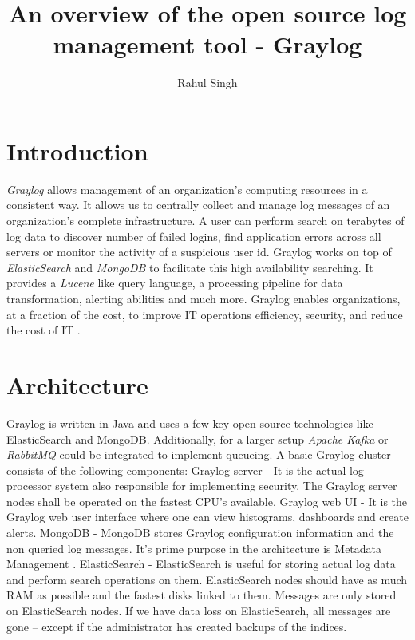\documentclass[9pt,twocolumn,twoside]{../../styles/osajnl}
\title{An overview of the open source log management tool - Graylog}
\author[1]{Rahul Singh}
\affil[1]{School of Informatics and Computing, Bloomington, IN 47408, U.S.A.}
\affil[*]{Corresponding authors: rahpsing@iu.edu}
\begin{document}
\maketitle

\section{Introduction}
\emph{Graylog} \cite{www-graylog-org} allows management of an
organization's computing resources in a consistent way. It allows us
to centrally collect and manage log messages of an organization’s
complete infrastructure. A user can perform search on terabytes of log
data to discover number of failed logins, find application errors
across all servers or monitor the activity of a suspicious user
id. Graylog works on top of \emph{ElasticSearch}
\cite{www-elasticsearch-wiki} and \emph{MongoDB}
\cite{www-mongodb-wiki} to facilitate this high availability
searching. It provides a \emph{Lucene} \cite{www-apachelucene-org}
like query language, a processing pipeline for data transformation,
alerting abilities and much more. Graylog enables organizations, at a
fraction of the cost, to improve IT operations efficiency, security,
and reduce the cost of IT \cite{www-graylog-hightech}.


\section{Architecture}

Graylog is written in Java and uses a few key open source technologies
like ElasticSearch and MongoDB. Additionally, for a larger setup
\emph{Apache Kafka} \cite{www-apachekafka-org} or \emph{RabbitMQ}
\cite{www-rabbitmq-com} could be integrated to implement queueing. A
basic Graylog cluster consists of the following components:
\newline
\newline
Graylog server - It is the actual log processor system also
responsible for implementing security. The Graylog server nodes shall
be operated on the fastest CPU's available.
\newline
\newline
Graylog web UI - It is the Graylog web user interface where one can
view histograms, dashboards and create alerts.
\newline
\newline
MongoDB - MongoDB stores Graylog configuration information and the non
queried log messages. It's prime purpose in the architecture is Metadata
Management \cite{www-graylogprocessing-severalnines}.
\newline
\newline
ElasticSearch - ElasticSearch is useful for storing actual log data
and perform search operations on them. ElasticSearch nodes should have
as much RAM as possible and the fastest disks linked to them. Messages
are only stored on ElasticSearch nodes. If we have data loss on
ElasticSearch, all messages are gone – except if the administrator has
created backups of the indices.
\end{document}
